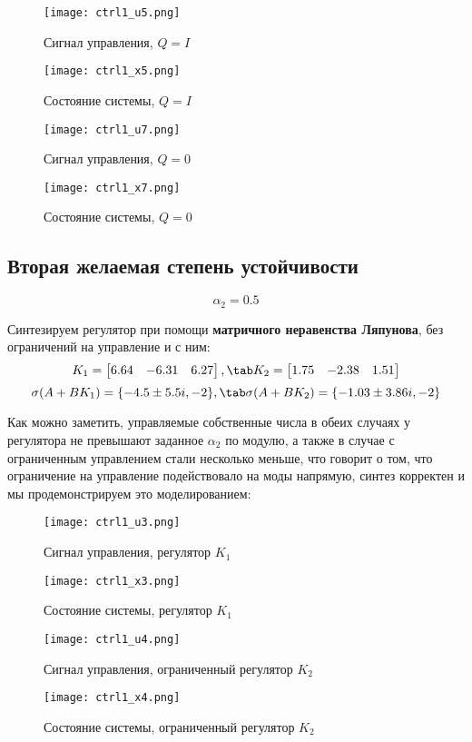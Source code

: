 \begin{figure}[ht]
  \centering
  \texttt{[image: ctrl1\_u5.png]}
  \caption{Сигнал управления, $Q=I$}
\end{figure}
\newpage
\begin{figure}[ht]
  \centering
  \texttt{[image: ctrl1\_x5.png]}
  \caption{Состояние системы, $Q=I$}
\end{figure}
\begin{figure}[ht]
  \centering
  \texttt{[image: ctrl1\_u7.png]}
  \caption{Сигнал управления, $Q=0$}
\end{figure}
\newpage
\begin{figure}[ht]
  \centering
  \texttt{[image: ctrl1\_x7.png]}
  \caption{Состояние системы, $Q=0$}
\end{figure}

\newpage
\subsection{Вторая желаемая степень устойчивости}
$$
    \alpha_2 = 0.5
$$

Синтезируем регулятор при помощи \textbf{матричного неравенства Ляпунова}, без ограничений на управление и с ним:
$$
  K_1 = \begin{bmatrix}
      6.64 & -6.31 & 6.27
    \end{bmatrix}, \tab
  K_2 = \begin{bmatrix}
    1.75 & -2.38 & 1.51
  \end{bmatrix}
$$
$$
  \sigma(A+BK_1)=\{ -4.5 \pm 5.5i, -2 \}, \tab \sigma(A+BK_2)=\{ -1.03 \pm 3.86i, -2 \}
$$

Как можно заметить, управляемые собственные числа в обеих случаях у  регулятора не превышают заданное $\alpha_2$ по модулю, 
а также в случае с ограниченным управлением стали несколько меньше, что говорит о том, что ограничение на управление подействовало на моды напрямую, 
синтез корректен и мы продемонстрируем это моделированием:

\newpage
\begin{figure}[ht]
  \centering
  \texttt{[image: ctrl1\_u3.png]}
  \caption{Сигнал управления, регулятор $K_1$}
\end{figure}
\begin{figure}[ht]
  \centering
  \texttt{[image: ctrl1\_x3.png]}
  \caption{Состояние системы, регулятор $K_1$}
\end{figure}
\newpage
\begin{figure}[ht]
  \centering
  \texttt{[image: ctrl1\_u4.png]}
  \caption{Сигнал управления, ограниченный регулятор $K_2$}
\end{figure}
\begin{figure}[ht]
  \centering
  \texttt{[image: ctrl1\_x4.png]}
  \caption{Состояние системы, ограниченный регулятор $K_2$}
\end{figure}

